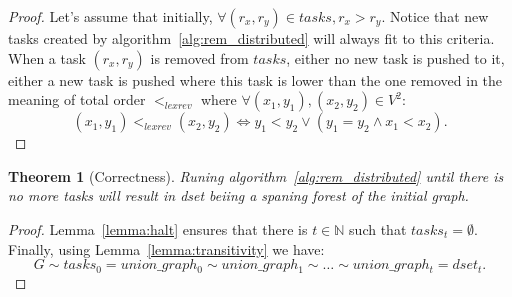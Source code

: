 \documentclass[12px]{article}
\newtheorem{theorem}{Theorem}[section]
\begin{document}
        \begin{proof}
          Let's assume that initially, $\forall (r_x, r_y) \in tasks, r_x > r_y$. Notice that new tasks created by
          algorithm~\ref{alg:rem_distributed} will always fit to this criteria. \\
          When a task $(r_x, r_y)$ is removed from $tasks$, either no new task is pushed to it, either a new task is pushed where this task is lower than the one removed in the meaning of total order $<_{lexrev}$ where $\forall (x_1, y_1), (x_2, y_2) \in V^2$:
          \[ (x_1, y_1) <_{lexrev} (x_2, y_2) \Longleftrightarrow y_1 < y_2 \vee (y_1 = y_2 \wedge x_1 < x_2). \]
        \end{proof}

        \begin{theorem}[Correctness]
          Runing algorithm~\ref{alg:rem_distributed} until there is no more tasks will result in dset beiing a spaning forest of the initial graph.
        \end{theorem}

        \begin{proof}
          Lemma~\ref{lemma:halt} ensures that there is $t \in \mathbb{N}$ such that $tasks_t = \emptyset$. Finally, using Lemma~\ref{lemma:transitivity} we have:
            \[ G \sim tasks_0 = union\_graph_0 \sim union\_graph_1 \sim \hdots \sim union\_graph_t = dset_t. \]
        \end{proof}




  
  
\end{document}
